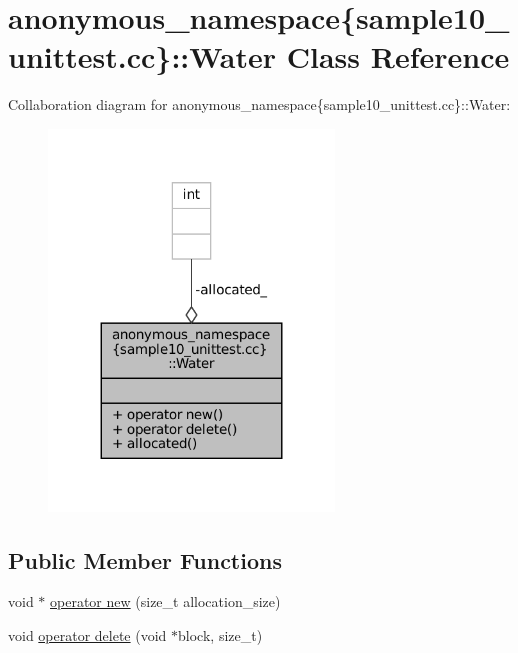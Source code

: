 \hypertarget{classanonymous__namespace_02sample10__unittest_8cc_03_1_1Water}{}\section{anonymous\+\_\+namespace\{sample10\+\_\+unittest.\+cc\}\+:\+:Water Class Reference}
\label{classanonymous__namespace_02sample10__unittest_8cc_03_1_1Water}


Collaboration diagram for anonymous\+\_\+namespace\{sample10\+\_\+unittest.\+cc\}\+:\+:Water\+:
\nopagebreak
\begin{figure}[H]
\begin{center}
\leavevmode
\includegraphics[width=215pt]{classanonymous__namespace_02sample10__unittest_8cc_03_1_1Water__coll__graph}
\end{center}
\end{figure}
\subsection*{Public Member Functions}
\begin{DoxyCompactItemize}
\item 
void $\ast$ \hyperlink{classanonymous__namespace_02sample10__unittest_8cc_03_1_1Water_a2a5072a65edbf0fb2d5909b70036047c}{operator new} (size\+\_\+t allocation\+\_\+size)
\item 
void \hyperlink{classanonymous__namespace_02sample10__unittest_8cc_03_1_1Water_a7a2259b7aa33ba748078cd0be39ad00a}{operator delete} (void $\ast$block, size\+\_\+t)
\end{DoxyCompactItemize}
